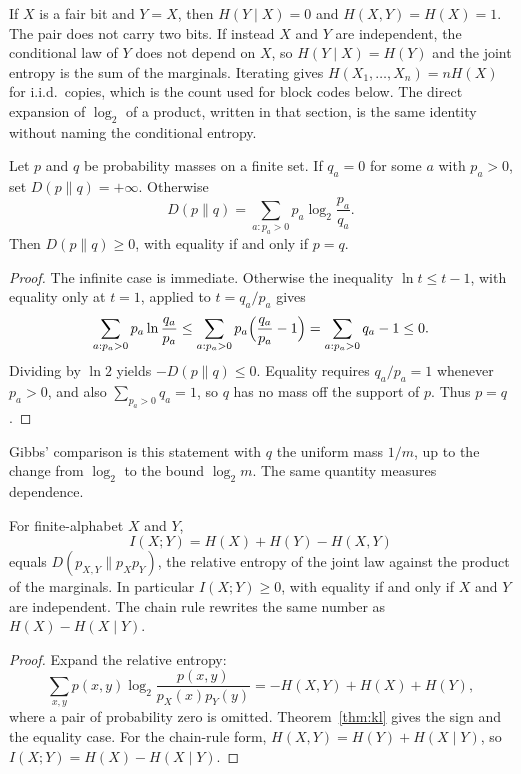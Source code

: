 If $X$ is a fair bit and $Y=X$, then $H(Y\mid X)=0$ and $H(X,Y)=H(X)=1$. The pair does not carry two bits. If instead $X$ and $Y$ are independent, the conditional law of $Y$ does not depend on $X$, so $H(Y\mid X)=H(Y)$ and the joint entropy is the sum of the marginals. Iterating gives $H(X_1,\ldots,X_n)=nH(X)$ for i.i.d.\ copies, which is the count used for block codes below. The direct expansion of $\log_2$ of a product, written in that section, is the same identity without naming the conditional entropy.

\begin{theorem}\label{thm:kl}
Let $p$ and $q$ be probability masses on a finite set. If $q_a=0$ for some $a$ with $p_a>0$, set $D(p\|q)=+\infty$. Otherwise
\[
 D(p\|q)=\sum_{a:p_a>0}p_a\log_2\frac{p_a}{q_a}.
\]
Then $D(p\|q)\ge0$, with equality if and only if $p=q$.
\end{theorem}
\begin{proof}
The infinite case is immediate. Otherwise the inequality $\ln t\le t-1$, with equality only at $t=1$, applied to $t=q_a/p_a$ gives
\[
 \sum_{a:p_a>0}p_a\ln\frac{q_a}{p_a}\le\sum_{a:p_a>0}p_a\Bigl(\frac{q_a}{p_a}-1\Bigr)=\sum_{a:p_a>0}q_a-1\le0.
\]
Dividing by $\ln 2$ yields $-D(p\|q)\le0$. Equality requires $q_a/p_a=1$ whenever $p_a>0$, and also $\sum_{p_a>0}q_a=1$, so $q$ has no mass off the support of $p$. Thus $p=q$.
\end{proof}

Gibbs' comparison is this statement with $q$ the uniform mass $1/m$, up to the change from $\log_2$ to the bound $\log_2 m$. The same quantity measures dependence.

\begin{theorem}\label{thm:mutual}
For finite-alphabet $X$ and $Y$,
\[
 I(X;Y)=H(X)+H(Y)-H(X,Y)
\]
equals $D(p_{X,Y}\|p_Xp_Y)$, the relative entropy of the joint law against the product of the marginals. In particular $I(X;Y)\ge0$, with equality if and only if $X$ and $Y$ are independent. The chain rule rewrites the same number as $H(X)-H(X\mid Y)$.
\end{theorem}
\begin{proof}
Expand the relative entropy:
\[
 \sum_{x,y}p(x,y)\log_2\frac{p(x,y)}{p_X(x)p_Y(y)}
 = -H(X,Y)+H(X)+H(Y),
\]
where a pair of probability zero is omitted. Theorem~\ref{thm:kl} gives the sign and the equality case. For the chain-rule form, $H(X,Y)=H(Y)+H(X\mid Y)$, so $I(X;Y)=H(X)-H(X\mid Y)$.
\end{proof}

